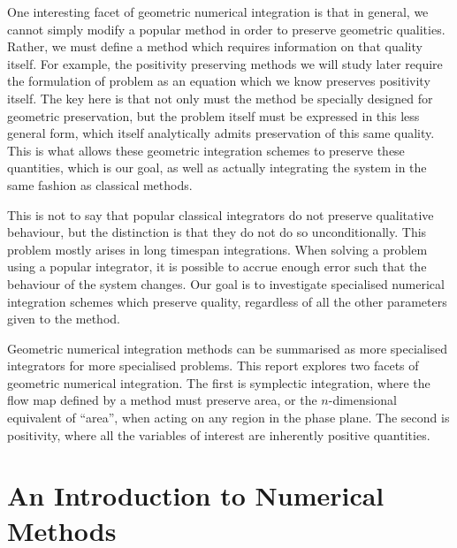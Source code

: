 \documentclass{report}
\theoremstyle{exampstyle} \newtheorem{example}[theorem]{Example}
\theoremstyle{exampstyle} \newtheorem{remark}[theorem]{Remark}
\theoremstyle{exampstyle} \newtheorem{definition}[theorem]{Definition}
\theoremstyle{exampstyle} \newtheorem{lemma}[theorem]{Lemma}
\begin{document}
One interesting facet of geometric numerical integration is that in general, we cannot simply modify a popular method in order to preserve geometric qualities.
Rather, we must define a method which requires information on that quality itself.
For example, the positivity preserving methods we will study later require the formulation of problem as an equation which we know preserves positivity itself.
The key here is that not only must the method be specially designed for geometric preservation,
but the problem itself must be expressed in this less general form, which itself analytically admits preservation of this same quality.
This is what allows these geometric integration schemes to preserve these quantities, which is our goal, as well as actually integrating the system in the same fashion as classical methods.

This is not to say that popular classical integrators do not preserve qualitative behaviour, but the distinction is that they do not do so unconditionally.
This problem mostly arises in long timespan integrations.
When solving a problem using a popular integrator, it is possible to accrue enough error such that the behaviour of the system changes.
Our goal is to investigate specialised numerical integration schemes which preserve quality, regardless of all the other parameters given to the method.

Geometric numerical integration methods can be summarised as more specialised integrators for more specialised problems.
This report explores two facets of geometric numerical integration.
The first is symplectic integration, where the flow map defined by a method must preserve area, or the $n$-dimensional equivalent of ``area'',
when acting on any region in the phase plane.
The second is positivity, where all the variables of interest are inherently positive quantities.

\section{An Introduction to Numerical Methods}
\end{document}
